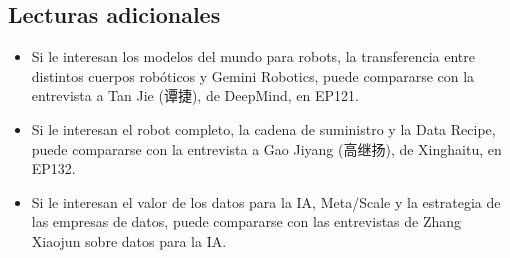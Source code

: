 \subsection{Lecturas adicionales}

\begin{itemize}
\item Si le interesan los modelos del mundo para robots, la transferencia entre distintos cuerpos robóticos y Gemini Robotics, puede compararse con la entrevista a Tan Jie (谭捷), de DeepMind, en EP121.
\item Si le interesan el robot completo, la cadena de suministro y la Data Recipe, puede compararse con la entrevista a Gao Jiyang (高继扬), de Xinghaitu, en EP132.
\item Si le interesan el valor de los datos para la IA, Meta/Scale y la estrategia de las empresas de datos, puede compararse con las entrevistas de Zhang Xiaojun sobre datos para la IA.
\end{itemize}


